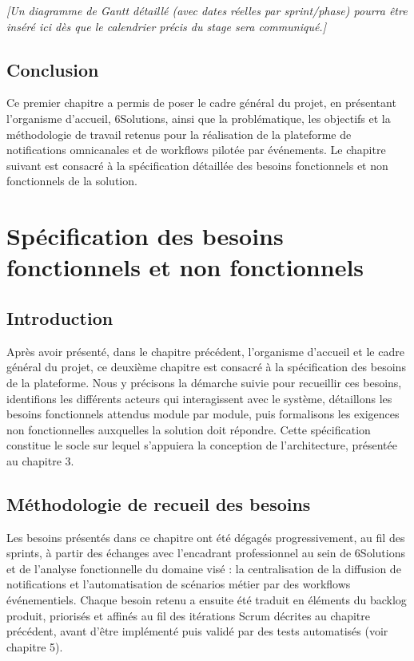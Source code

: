\documentclass[12pt,a4paper]{report}
\newcommand{\placeholder}[1]{\par\smallskip\noindent\textcolor{placeholderred}{\itshape [#1]}\par\smallskip}
\begin{document}
\placeholder{Un diagramme de Gantt détaillé (avec dates réelles par sprint/phase) pourra être inséré ici dès que le calendrier précis du stage sera communiqué.}

\section*{Conclusion}

Ce premier chapitre a permis de poser le cadre général du projet, en présentant l'organisme d'accueil, 6Solutions, ainsi que la problématique, les objectifs et la méthodologie de travail retenus pour la réalisation de la plateforme de notifications omnicanales et de workflows pilotée par événements. Le chapitre suivant est consacré à la spécification détaillée des besoins fonctionnels et non fonctionnels de la solution.

\chapter{Spécification des besoins fonctionnels et non fonctionnels}

\section*{Introduction}

Après avoir présenté, dans le chapitre précédent, l'organisme d'accueil et le cadre général du projet, ce deuxième chapitre est consacré à la spécification des besoins de la plateforme. Nous y précisons la démarche suivie pour recueillir ces besoins, identifions les différents acteurs qui interagissent avec le système, détaillons les besoins fonctionnels attendus module par module, puis formalisons les exigences non fonctionnelles auxquelles la solution doit répondre. Cette spécification constitue le socle sur lequel s'appuiera la conception de l'architecture, présentée au chapitre 3.

\section{Méthodologie de recueil des besoins}

Les besoins présentés dans ce chapitre ont été dégagés progressivement, au fil des sprints, à partir des échanges avec l'encadrant professionnel au sein de 6Solutions et de l'analyse fonctionnelle du domaine visé : la centralisation de la diffusion de notifications et l'automatisation de scénarios métier par des workflows événementiels. Chaque besoin retenu a ensuite été traduit en éléments du backlog produit, priorisés et affinés au fil des itérations Scrum décrites au chapitre précédent, avant d'être implémenté puis validé par des tests automatisés (voir chapitre 5).
\end{document}
